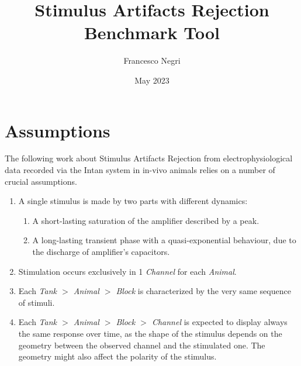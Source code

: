 \documentclass[12pt]{article}
\title{Stimulus Artifacts Rejection Benchmark Tool}
\author{Francesco Negri}
\date{May 2023}
\begin{document}
\maketitle


\section*{Assumptions}
The following work about Stimulus Artifacts Rejection from electrophysiological data
recorded via the Intan system in in-vivo animals relies on a number of crucial assumptions.
\begin{enumerate}
    \item A single stimulus is made by two parts with different dynamics:
          \begin{enumerate}
              \item A short-lasting saturation of the amplifier described by a peak.
              \item A long-lasting transient phase with a quasi-exponential behaviour, due
                    to the discharge of amplifier's capacitors.
          \end{enumerate}
    \item Stimulation occurs exclusively in 1 \textit{Channel} for each \textit{Animal}.
    \item Each \textit{Tank \(>\) Animal \(>\) Block} is characterized by
          the very same sequence of stimuli.
    \item Each \textit{Tank \(>\) Animal \(>\) Block \(>\) Channel} is expected to
          display always the same response over time, as the shape of the stimulus depends
          on the geometry between the observed channel and the stimulated one. The geometry
          might also affect the polarity of the stimulus.
\end{enumerate}
\end{document}
